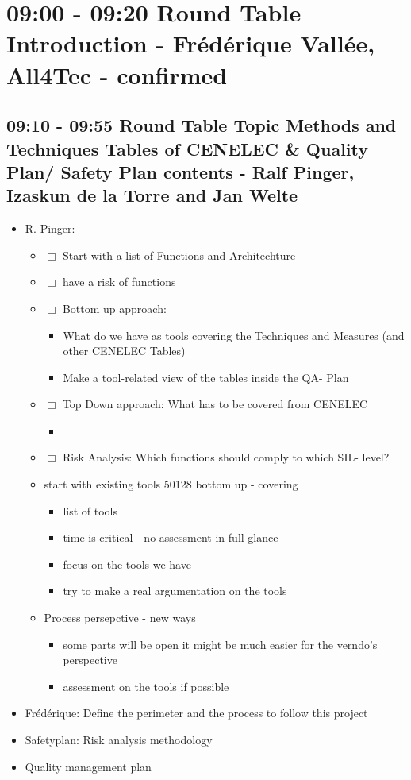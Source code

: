 \documentclass[a4paper,german]{article}
\begin{document}
\setcounter{tocdepth}{3}
\tableofcontents
\vspace*{1cm}
\section{09:00 - 09:20 Round Table Introduction - Frédérique Vallée, All4Tec - confirmed}
\label{sec-1}
\subsection{09:10 - 09:55 Round Table Topic Methods and Techniques Tables of CENELEC \& Quality Plan/ Safety Plan  contents - Ralf Pinger, Izaskun de la Torre and Jan Welte}
\label{sec-1-1}

\begin{itemize}
\item R. Pinger:
\begin{itemize}
\item $\Box$ Start with a list of Functions and Architechture
\item $\Box$ have a risk of functions
\item $\Box$ Bottom up approach:
\begin{itemize}
\item What do we have as tools covering the Techniques and Measures (and other CENELEC Tables)
\item Make a tool-related view of the tables inside the QA- Plan
\end{itemize}
\item $\Box$ Top Down approach: What has to be covered from CENELEC
\begin{itemize}
\item 
\end{itemize}
\item $\Box$ Risk Analysis: Which functions should comply to which SIL- level?
\item start with existing tools 50128 bottom up - covering
\begin{itemize}
\item list of tools
\item time is critical - no assessment in full glance
\item focus on the tools we have
\item try to make a real argumentation on the tools
\end{itemize}
\item Process persepctive - new ways
\begin{itemize}
\item some parts will be open it might be much easier for the verndo's perspective
\item assessment on the tools if possible
\end{itemize}
\end{itemize}
\item Frédérique: Define the perimeter and the process to follow this project
\item Safetyplan: Risk analysis methodology
\item Quality management plan
\end{itemize}
\end{document}
